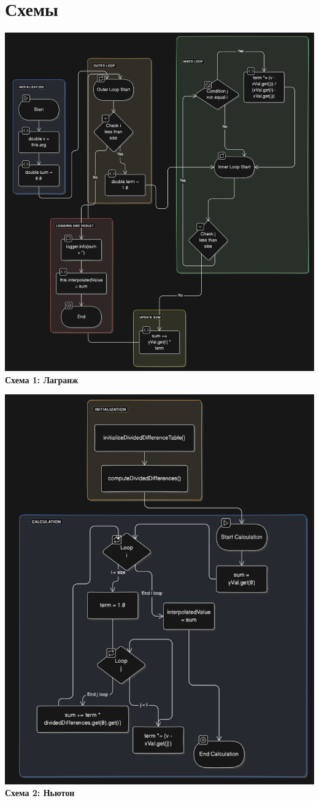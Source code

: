\documentclass{article}
\begin{document}
\section{Схемы}
\begin{center}
    \includegraphics[width=.7\textwidth]{lagr.png}\\
    \textbf{Схема 1: Лагранж}
\end{center}
\begin{center}
    \includegraphics[width=.9\textwidth]{newt.png}\\
    \textbf{Схема 2: Ньютон}
\end{center}
\end{document}
